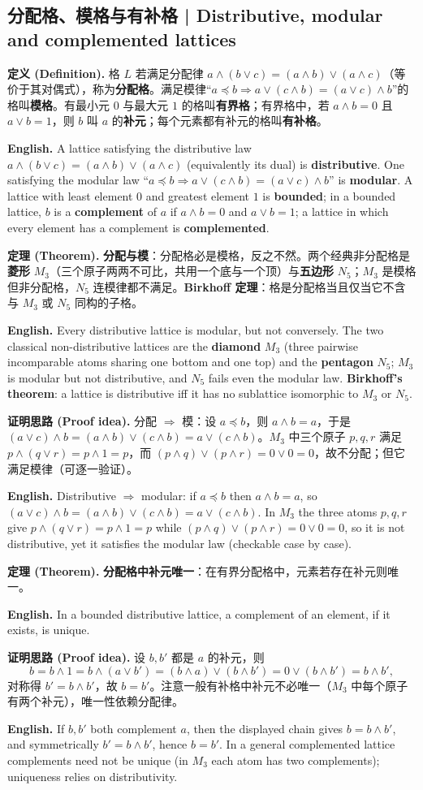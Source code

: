 \documentclass[UTF8,11pt,a4paper]{ctexart}
\newcommand{\EN}[1]{\par\noindent \textbf{English.} #1\par}
\newcommand{\DEF}[2]{\par\noindent\textbf{定义 (Definition).} #1\par\EN{#2}}
\newcommand{\THM}[2]{\par\noindent\textbf{定理 (Theorem).} #1\par\EN{#2}}
\newcommand{\PRF}[2]{\par\noindent\textbf{证明思路 (Proof idea).} #1\par\EN{#2}}
\begin{document}
\subsection{分配格、模格与有补格 | Distributive, modular and complemented lattices}
\DEF{格 $L$ 若满足分配律 $a\wedge(b\vee c)=(a\wedge b)\vee(a\wedge c)$（等价于其对偶式），称为\textbf{分配格}。满足模律“$a\preccurlyeq b\Rightarrow a\vee(c\wedge b)=(a\vee c)\wedge b$”的格叫\textbf{模格}。有最小元 $0$ 与最大元 $1$ 的格叫\textbf{有界格}；有界格中，若 $a\wedge b=0$ 且 $a\vee b=1$，则 $b$ 叫 $a$ 的\textbf{补元}；每个元素都有补元的格叫\textbf{有补格}。}{A lattice satisfying the distributive law $a\wedge(b\vee c)=(a\wedge b)\vee(a\wedge c)$ (equivalently its dual) is \textbf{distributive}. One satisfying the modular law ``$a\preccurlyeq b\Rightarrow a\vee(c\wedge b)=(a\vee c)\wedge b$'' is \textbf{modular}. A lattice with least element $0$ and greatest element $1$ is \textbf{bounded}; in a bounded lattice, $b$ is a \textbf{complement} of $a$ if $a\wedge b=0$ and $a\vee b=1$; a lattice in which every element has a complement is \textbf{complemented}.}
\THM{\textbf{分配与模}：分配格必是模格，反之不然。两个经典非分配格是\textbf{菱形} $M_3$（三个原子两两不可比，共用一个底与一个顶）与\textbf{五边形} $N_5$；$M_3$ 是模格但非分配格，$N_5$ 连模律都不满足。\textbf{Birkhoff 定理}：格是分配格当且仅当它不含与 $M_3$ 或 $N_5$ 同构的子格。}{Every distributive lattice is modular, but not conversely. The two classical non-distributive lattices are the \textbf{diamond} $M_3$ (three pairwise incomparable atoms sharing one bottom and one top) and the \textbf{pentagon} $N_5$; $M_3$ is modular but not distributive, and $N_5$ fails even the modular law. \textbf{Birkhoff's theorem}: a lattice is distributive iff it has no sublattice isomorphic to $M_3$ or $N_5$.}
\PRF{分配 $\Rightarrow$ 模：设 $a\preccurlyeq b$，则 $a\wedge b=a$，于是 $(a\vee c)\wedge b=(a\wedge b)\vee(c\wedge b)=a\vee(c\wedge b)$。$M_3$ 中三个原子 $p,q,r$ 满足 $p\wedge(q\vee r)=p\wedge1=p$，而 $(p\wedge q)\vee(p\wedge r)=0\vee0=0$，故不分配；但它满足模律（可逐一验证）。}{Distributive $\Rightarrow$ modular: if $a\preccurlyeq b$ then $a\wedge b=a$, so $(a\vee c)\wedge b=(a\wedge b)\vee(c\wedge b)=a\vee(c\wedge b)$. In $M_3$ the three atoms $p,q,r$ give $p\wedge(q\vee r)=p\wedge1=p$ while $(p\wedge q)\vee(p\wedge r)=0\vee0=0$, so it is not distributive, yet it satisfies the modular law (checkable case by case).}
\THM{\textbf{分配格中补元唯一}：在有界分配格中，元素若存在补元则唯一。}{In a bounded distributive lattice, a complement of an element, if it exists, is unique.}
\PRF{设 $b,b'$ 都是 $a$ 的补元，则
\[
b=b\wedge1=b\wedge(a\vee b')=(b\wedge a)\vee(b\wedge b')=0\vee(b\wedge b')=b\wedge b',
\]
对称得 $b'=b\wedge b'$，故 $b=b'$。注意一般有补格中补元不必唯一（$M_3$ 中每个原子有两个补元），唯一性依赖分配律。}{If $b,b'$ both complement $a$, then the displayed chain gives $b=b\wedge b'$, and symmetrically $b'=b\wedge b'$, hence $b=b'$. In a general complemented lattice complements need not be unique (in $M_3$ each atom has two complements); uniqueness relies on distributivity.}
\end{document}

